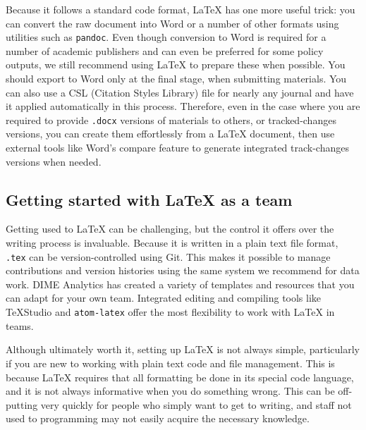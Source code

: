 Because it follows a standard code format,
{\LaTeX} has one more useful trick:
you can convert the raw document into Word
or a number of other formats
using utilities such as \texttt{pandoc}.
Even though conversion to Word is required
for a number of academic publishers and can even be preferred for some policy outputs,
we still recommend using {\LaTeX} to prepare these when possible.
You should export to Word only at the final stage, when submitting materials.
You can also use a CSL (Citation Styles Library) file
for nearly any journal and have it applied automatically in this process.
Therefore, even in the case where you are required to provide
\texttt{.docx} versions of materials to others, or tracked-changes versions,
you can create them effortlessly from a {\LaTeX} document,
then use external tools like Word's compare feature
to generate integrated track-changes versions when needed.

\subsection{Getting started with {\LaTeX} as a team}

Getting used to {\LaTeX} can be challenging,
but the control it offers over the writing process is invaluable.
Because it is written in a plain text file format,
\texttt{.tex} can be version-controlled using Git.
This makes it possible to manage contributions and version histories
using the same system we recommend for data work.
DIME Analytics has created a variety of templates and resources
that you can adapt for your own team.
Integrated editing and compiling tools like TeXStudio
and \texttt{atom-latex}
offer the most flexibility to work with {\LaTeX} in teams.

Although ultimately worth it, setting up {\LaTeX} is not always simple,
particularly if you are new to working with plain text code and file management.
This is because {\LaTeX} requires that all formatting be done in its special code language,
and it is not always informative when you do something wrong.
This can be off-putting very quickly for people
who simply want to get to writing,
and staff not used to programming may not easily acquire the necessary knowledge.

